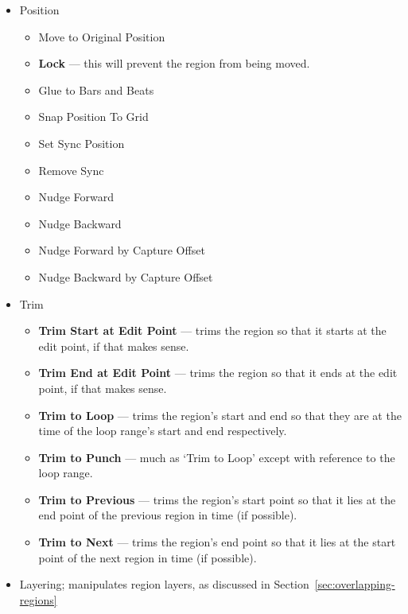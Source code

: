 \documentclass[10pt,a4paper]{book}
\begin{document}
{\begin{itemize}
\begin{itemize}
  pitch-shift the region.
\item \textbf{Reverse} --- flip the region backwards in time.
\item Glose Gaps
\item Place Transient
\item Rhythm Ferret\ldots
\item Strip Silence\ldots
\end{itemize}
\item Position
\begin{itemize}
\item Move to Original Position
\item \textbf{Lock} --- this will prevent the region from being moved.
\item Glue to Bars and Beats
\item Snap Position To Grid
\item Set Sync Position
\item Remove Sync
\item Nudge Forward
\item Nudge Backward
\item Nudge Forward by Capture Offset
\item Nudge Backward by Capture Offset
\end{itemize}
\item Trim
\begin{itemize}
\item \textbf{Trim Start at Edit Point} --- trims the region so that
  it starts at the edit point, if that makes sense.
\item \textbf{Trim End at Edit Point} --- trims the region so that
  it ends at the edit point, if that makes sense.
\item \textbf{Trim to Loop} --- trims the region's start and end so
  that they are at the time of the loop range's start and end
  respectively.
\item \textbf{Trim to Punch} --- much as `Trim to Loop' except with
  reference to the loop range.
\item \textbf{Trim to Previous} --- trims the region's start point so
  that it lies at the end point of the previous region in time (if
  possible).
\item \textbf{Trim to Next} --- trims the region's end point so
  that it lies at the start point of the next region in time (if
  possible).
\end{itemize}
\item Layering; manipulates region layers, as discussed in
  Section~\ref{sec:overlapping-regions}

\end{itemize}}
\end{document}
